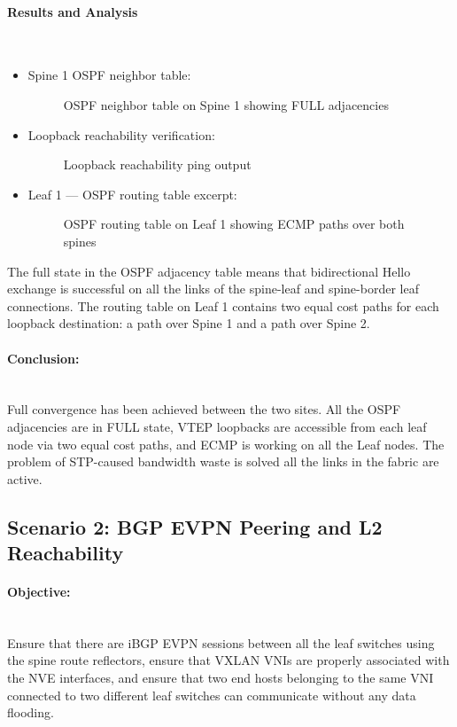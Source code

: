 \paragraph{Results and Analysis}~\\
\begin{itemize}
    \item []Spine 1 OSPF neighbor table:
    \begin{figure}[!htbp]
        \centering
        \OspfSpine
        \caption{OSPF neighbor table on Spine 1 showing FULL adjacencies}
        \label{fig:ospf-spine}
    \end{figure}
    \item []Loopback reachability verification:
    \begin{figure}[!htbp]
        \centering
        \loopbackreachability
        \caption{Loopback reachability ping output}
        \label{fig:loopback-reachability}
    \end{figure}
    \newpage
    \item []Leaf 1 — OSPF routing table excerpt:
    \begin{figure}[!htbp]
        \centering
        \OspfRouting
        \caption{OSPF routing table on Leaf 1 showing ECMP paths over both spines}
        \label{fig:ospf-routing-ecmp}
    \end{figure}
\end{itemize}
The full state in the OSPF adjacency table means that bidirectional Hello exchange is successful on all the links of the spine-leaf and spine-border leaf connections. The routing table on Leaf 1 contains two equal cost paths for each loopback destination: a path over Spine 1 and a path over Spine 2.
\paragraph{Conclusion:}~\\
Full convergence has been achieved between the two sites. All the OSPF adjacencies are in FULL state, VTEP loopbacks are accessible from each leaf node via two equal cost paths, and ECMP is working on all the Leaf nodes. The problem of STP-caused bandwidth waste is solved all the links in the fabric are active.

\subsection{Scenario 2: BGP EVPN Peering and L2 Reachability}
\paragraph{Objective:}~\\
Ensure that there are iBGP EVPN sessions between all the leaf switches using the spine route reflectors, ensure that VXLAN VNIs are properly associated with the NVE interfaces, and ensure that two end hosts belonging to the same VNI connected to two different leaf switches can communicate without any data flooding.

